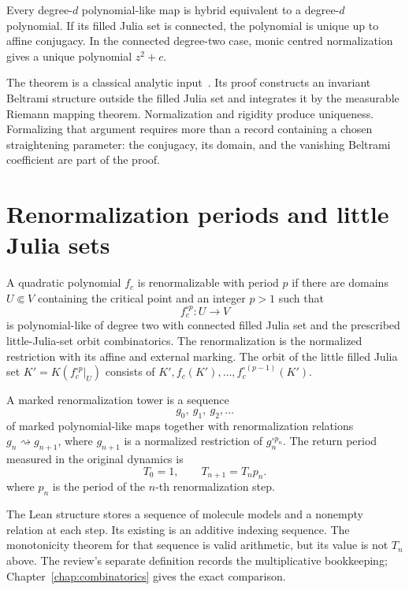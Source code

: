  \begin{theorem}
 Every degree-$d$ polynomial-like map is hybrid equivalent to a
 degree-$d$ polynomial.  If its filled Julia set is connected, the
 polynomial is unique up to affine conjugacy.  In the connected
 degree-two case, monic centred normalization gives a unique
 polynomial $z^2+c$.
 \end{theorem}

 The theorem is a classical analytic input~\cite{DHPolynomialLike}.
 Its proof constructs an invariant Beltrami structure outside the
 filled Julia set and integrates it by the measurable Riemann mapping
 theorem.  Normalization and rigidity produce uniqueness.  Formalizing
 that argument requires more than a record containing a chosen
 straightening parameter: the conjugacy, its domain, and the vanishing
 Beltrami coefficient are part of the proof.

 \section{Renormalization periods and little Julia sets}

 \begin{definition}
\label{def:quadratic-renormalization}
A quadratic polynomial $f_c$ is renormalizable with period $p$ if there are
domains $U\Subset V$ containing the critical point and an integer $p>1$ such
that
\[
 f_c^{\circ p}:U\to V
\]
is polynomial-like of degree two with connected filled Julia set and
the prescribed little-Julia-set orbit combinatorics.  The
renormalization is the normalized restriction with its affine and
external marking.  The orbit of the little filled Julia set
$K'=K(f_c^{\circ p}|_U)$ consists of
$K',f_c(K'),\ldots,f_c^{\circ(p-1)}(K')$.
\end{definition}

\begin{definition}
\label{def:renormalization-tower}
A marked renormalization tower is a sequence
\[
 g_0,\ g_1,\ g_2,\ldots
\]
of marked polynomial-like maps together with renormalization relations
$g_n\rightsquigarrow g_{n+1}$, where $g_{n+1}$ is a normalized
restriction of $g_n^{\circ p_n}$.  The return period measured in the
original dynamics is
\[
 T_0=1,\qquad T_{n+1}=T_np_n.
\]
where $p_n$ is the period of the $n$-th renormalization step.
\end{definition}

The Lean structure  stores a sequence of
molecule models and a nonempty relation at each step.  Its existing
 is an additive indexing sequence.  The
monotonicity theorem for that sequence is valid arithmetic, but its
value is not $T_n$ above.  The review's separate definition
 records the multiplicative bookkeeping;
Chapter~\ref{chap:combinatorics} gives the exact comparison.

